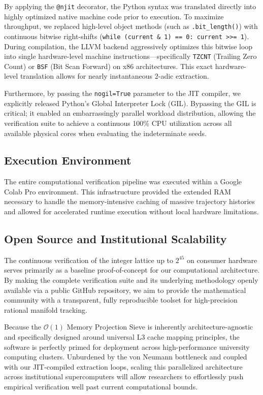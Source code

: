 \documentclass[11pt, a4paper]{article}
\theoremstyle{definition}
\begin{document}
By applying the \texttt{@njit} decorator, the Python syntax was translated directly into highly optimized native machine code prior to execution. To maximize throughput, we replaced high-level object methods (such as \texttt{.bit\_length()}) with continuous bitwise right-shifts (\texttt{while (current \& 1) == 0: current >>= 1}). During compilation, the LLVM backend aggressively optimizes this bitwise loop into single hardware-level machine instructions---specifically \texttt{TZCNT} (Trailing Zero Count) or \texttt{BSF} (Bit Scan Forward) on x86 architectures. This exact hardware-level translation allows for nearly instantaneous 2-adic extraction.

Furthermore, by passing the \texttt{nogil=True} parameter to the JIT compiler, we explicitly released Python's Global Interpreter Lock (GIL). Bypassing the GIL is critical; it enabled an embarrassingly parallel workload distribution, allowing the verification suite to achieve a continuous 100\% CPU utilization across all available physical cores when evaluating the indeterminate seeds.

\subsection{Execution Environment}
The entire computational verification pipeline was executed within a Google Colab Pro environment. This infrastructure provided the extended RAM necessary to handle the memory-intensive caching of massive trajectory histories and allowed for accelerated runtime execution without local hardware limitations.

\subsection{Open Source and Institutional Scalability}
The continuous verification of the integer lattice up to $2^{45}$ on consumer hardware serves primarily as a baseline proof-of-concept for our computational architecture. By making the complete verification suite and its underlying methodology openly available via a public GitHub repository, we aim to provide the mathematical community with a transparent, fully reproducible toolset for high-precision rational manifold tracking.

Because the $\mathcal{O}(1)$ Memory Projection Sieve is inherently architecture-agnostic and specifically designed around universal L3 cache mapping principles, the software is perfectly primed for deployment across high-performance university computing clusters. Unburdened by the von Neumann bottleneck and coupled with our JIT-compiled extraction loops, scaling this parallelized architecture across institutional supercomputers will allow researchers to effortlessly push empirical verification well past current computational bounds.
\end{document}
